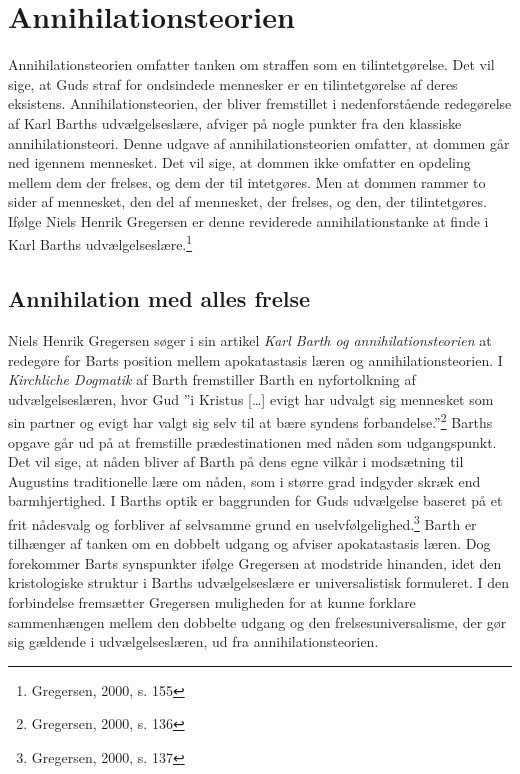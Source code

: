 \chapter{Annihilationsteorien}
Annihilationsteorien omfatter tanken om straffen som en tilintetgørelse. Det vil sige, at Guds straf for ondsindede mennesker er en tilintetgørelse af deres eksistens. Annihilationsteorien, der bliver fremstillet i nedenforstående redegørelse af Karl Barths udvælgelseslære, afviger på nogle punkter fra den klassiske annihilationsteori. Denne udgave af annihilationsteorien omfatter, at dommen går ned igennem mennesket. Det vil sige, at dommen ikke omfatter en opdeling mellem dem der frelses, og dem der til intetgøres. Men at dommen rammer to sider af mennesket, den del af mennesket, der frelses, og den, der tilintetgøres. Ifølge Niels Henrik Gregersen er denne reviderede annihilationstanke at finde i Karl Barths udvælgelseslære.\footnote{Gregersen, 2000, s. 155}   

\section{Annihilation med alles frelse}
Niels Henrik Gregersen søger i sin artikel \textit{Karl Barth og annihilationsteorien} at redegøre for Barts position mellem apokatastasis læren og annihilationsteorien. I \textit{Kirchliche Dogmatik} af Barth fremstiller Barth en nyfortolkning af udvælgelseslæren, hvor Gud ”i Kristus […] evigt har udvalgt sig mennesket som sin partner og evigt har valgt sig selv til at bære syndens forbandelse.”\footnote{Gregersen, 2000, s. 136} Barths opgave går ud på at fremstille prædestinationen med nåden som udgangspunkt. Det vil sige, at nåden bliver af Barth på dens egne vilkår i modsætning til Augustins traditionelle lære om nåden, som i større grad indgyder skræk end barmhjertighed. I Barths optik er baggrunden for Guds udvælgelse baseret på et frit nådesvalg og forbliver af selvsamme grund en uselvfølgelighed.\footnote{Gregersen, 2000, s. 137} Barth er tilhænger af tanken om en dobbelt udgang og afviser apokatastasis læren. Dog forekommer Barts synspunkter ifølge Gregersen at modstride hinanden, idet den kristologiske struktur i Barths udvælgelseslære er universalistisk formuleret. I den forbindelse fremsætter Gregersen muligheden for at kunne forklare sammenhængen mellem den dobbelte udgang og den frelsesuniversalisme, der gør sig gældende i udvælgelseslæren, ud fra annihilationsteorien.

